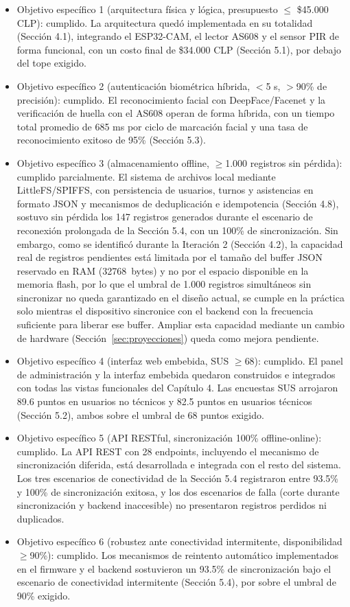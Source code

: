 \documentclass{iccmemoria}
\begin{document}
\begin{itemize}
    \item Objetivo específico 1 (arquitectura física y lógica, presupuesto $\leq$ \$45.000 CLP): cumplido. La arquitectura quedó implementada en su totalidad (Sección 4.1), integrando el ESP32-CAM, el lector AS608 y el sensor PIR de forma funcional, con un costo final de \$34.000 CLP (Sección 5.1), por debajo del tope exigido.
    \item Objetivo específico 2 (autenticación biométrica híbrida, $<$5 s, $>$90\% de precisión): cumplido. El reconocimiento facial con DeepFace/Facenet y la verificación de huella con el AS608 operan de forma híbrida, con un tiempo total promedio de 685 ms por ciclo de marcación facial y una tasa de reconocimiento exitoso de 95\% (Sección 5.3).
    \item Objetivo específico 3 (almacenamiento offline, $\geq$1.000 registros sin pérdida): cumplido parcialmente. El sistema de archivos local mediante LittleFS/SPIFFS, con persistencia de usuarios, turnos y asistencias en formato JSON y mecanismos de deduplicación e idempotencia (Sección 4.8), sostuvo sin pérdida los 147 registros generados durante el escenario de reconexión prolongada de la Sección 5.4, con un 100\% de sincronización. Sin embargo, como se identificó durante la Iteración 2 (Sección 4.2), la capacidad real de registros pendientes está limitada por el tamaño del buffer JSON reservado en RAM (32768~bytes) y no por el espacio disponible en la memoria flash, por lo que el umbral de 1.000 registros simultáneos sin sincronizar no queda garantizado en el diseño actual, se cumple en la práctica solo mientras el dispositivo sincronice con el backend con la frecuencia suficiente para liberar ese buffer. Ampliar esta capacidad mediante un cambio de hardware (Sección~\ref{sec:proyecciones}) queda como mejora pendiente.
    \item Objetivo específico 4 (interfaz web embebida, SUS $\geq$68): cumplido. El panel de administración y la interfaz embebida quedaron construidos e integrados con todas las vistas funcionales del Capítulo 4. Las encuestas SUS arrojaron 89.6 puntos en usuarios no técnicos y 82.5 puntos en usuarios técnicos (Sección 5.2), ambos sobre el umbral de 68 puntos exigido.
    \item Objetivo específico 5 (API RESTful, sincronización 100\% offline-online): cumplido. La API REST con 28 endpoints, incluyendo el mecanismo de sincronización diferida, está desarrollada e integrada con el resto del sistema. Los tres escenarios de conectividad de la Sección 5.4 registraron entre 93.5\% y 100\% de sincronización exitosa, y los dos escenarios de falla (corte durante sincronización y backend inaccesible) no presentaron registros perdidos ni duplicados.
    \item Objetivo específico 6 (robustez ante conectividad intermitente, disponibilidad $\geq$90\%): cumplido. Los mecanismos de reintento automático implementados en el firmware y el backend sostuvieron un 93.5\% de sincronización bajo el escenario de conectividad intermitente (Sección 5.4), por sobre el umbral de 90\% exigido.
\end{itemize}
\end{document}
